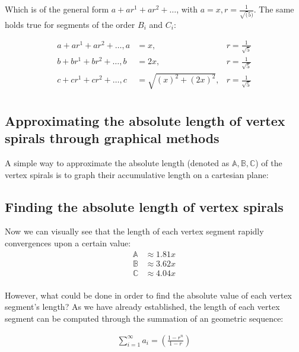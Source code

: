 \noindent
Which is of the general form $a + ar^1 + ar^2 + \ldots$, with $a = x, r = \frac{1}{\sqrt(5)}$. The same holds true for segments of the order $B_{i}$ and $C_{i}$:

\begin{equation}
    \begin{aligned}
        a + ar^1 + ar^2 + \ldots, a &= x, &r = \frac{1}{\sqrt{5}} \\
        b + br^1 + br^2 + \ldots, b &= 2x, &r = \frac{1}{\sqrt{5}} \\
        c + cr^1 + cr^2 + \ldots, c &= \sqrt{(x)^2 + (2x)^2}, &r = \frac{1}{\sqrt{5}} \\
    \end{aligned}
\end{equation}

\subsection{Approximating the absolute length of vertex spirals through graphical methods}
A simple way to approximate the absolute length (denoted as $\mathbb{A}, \mathbb{B}, \mathbb{C}$) of the vertex spirals is to graph their accumulative length on a cartesian plane:



\subsection{Finding the absolute length of vertex spirals}
Now we can visually see that the length of each vertex segment rapidly convergences upon a certain value:
\begin{equation}
    \begin{aligned}
        \mathbb{A} &\approx 1.81x \\
        \mathbb{B} &\approx 3.62x \\
        \mathbb{C} &\approx 4.04x \\
    \end{aligned}
\end{equation}

\noindent
However, what could be done in order to find the absolute value of each vertex segment's length? As we have already established, the length of each vertex segment can be computed through the summation of an geometric sequence:

\begin{equation}
    \begin{aligned}
        \sum_{i=1}^{\infty}a_i = \left(\frac{1-r^n}{1-r}\right)
    \end{aligned}
\end{equation}

